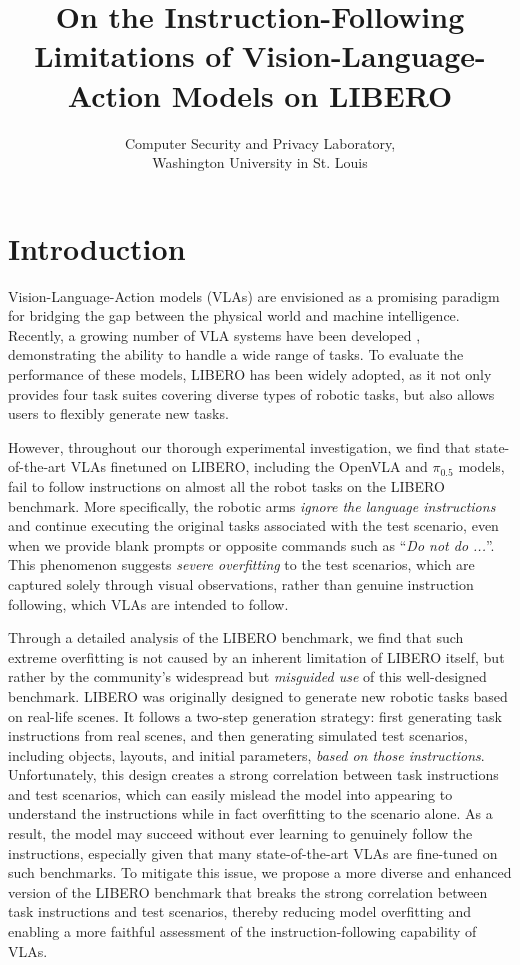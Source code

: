 \documentclass{article}
\title{On the Instruction-Following Limitations of Vision-Language-Action Models on LIBERO}
\author{Computer Security and Privacy Laboratory,\\ Washington University in St. Louis}
\date{}
\begin{document}
\maketitle

\section{Introduction}

Vision-Language-Action models (VLAs) are envisioned as a promising paradigm for bridging the gap between the physical world and machine intelligence. Recently, a growing number of VLA systems have been developed \cite{kim2025openvla, kim2025fine, black2024pi_0, intelligence2025pi_}, demonstrating the ability to handle a wide range of tasks. To evaluate the performance of these models, LIBERO \cite{liu2023libero} has been widely adopted, as it not only provides four task suites covering diverse types of robotic tasks, but also allows users to flexibly generate new tasks. 

However, throughout our thorough experimental investigation, we find that state-of-the-art VLAs finetuned on LIBERO, including the OpenVLA and $\pi_{0.5}$ models, fail to follow instructions on almost all the robot tasks on the LIBERO benchmark. More specifically, the robotic arms \textit{ignore the language instructions} and continue executing the original tasks associated with the test scenario, even when we provide blank prompts or opposite commands such as ``\textit{Do not do ...}''. This phenomenon suggests \textit{severe overfitting} to the test scenarios, which are captured solely through visual observations, rather than genuine instruction following, which VLAs are intended to follow.

Through a detailed analysis of the LIBERO benchmark, we find that such extreme overfitting is not caused by an inherent limitation of LIBERO itself, but rather by the community’s widespread but \textit{misguided use} of this well-designed benchmark. LIBERO was originally designed to generate new robotic tasks based on real-life scenes. It follows a two-step generation strategy: first generating task instructions from real scenes, and then generating simulated test scenarios, including objects, layouts, and initial parameters, \textit{based on those instructions}. Unfortunately, this design creates a strong correlation between task instructions and test scenarios, which can easily mislead the model into appearing to understand the instructions while in fact overfitting to the scenario alone. As a result, the model may succeed without ever learning to genuinely follow the instructions, especially given that many state-of-the-art VLAs are fine-tuned on such benchmarks. To mitigate this issue, we propose a more diverse and enhanced version of the LIBERO benchmark that breaks the strong correlation between task instructions and test scenarios, thereby reducing model overfitting and enabling a more faithful assessment of the instruction-following capability of VLAs.
\end{document}
